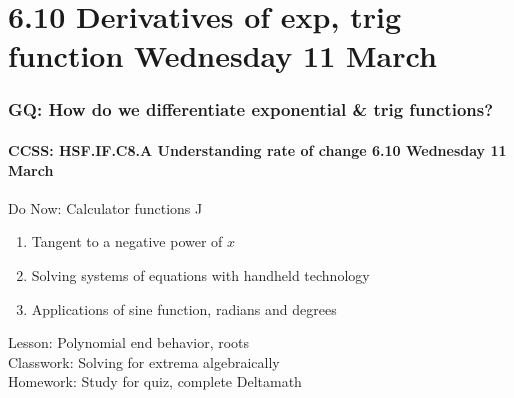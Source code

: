 \documentclass{beamer}
\begin{document}
\section{6.10 Derivatives of exp, trig function \hfill Wednesday 11 March}
  \frame
  {
    \frametitle{GQ: How do we differentiate exponential \& trig functions?}
    \framesubtitle{CCSS: HSF.IF.C8.A Understanding rate of change \hfill \alert{6.10 Wednesday 11 March}}
    \begin{block}{Do Now: Calculator functions J}
      \begin{enumerate}
        \item Tangent to a negative power of $x$
        \item Solving systems of equations with handheld technology
        \item Applications of sine function, radians and degrees
      \end{enumerate}
      \end{block}
      Lesson: Polynomial end behavior, roots \\
      Classwork: Solving for extrema algebraically \\ 
      Homework: Study for quiz, complete Deltamath
      }
                  
\end{document}

